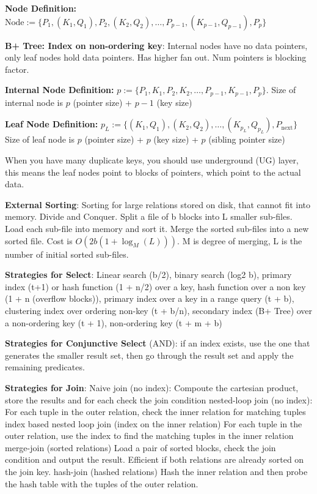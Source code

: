 \documentclass{article}
\begin{document}
\noindent \textbf{Node Definition:} $\text{Node} := \{P_1, (K_1, Q_1), P_2, (K_2, Q_2), \ldots, P_{p-1}, (K_{p-1}, Q_{p-1}), P_p\}$

\noindent \textbf{B+ Tree: Index on non-ordering key}: Internal nodes have no data pointers, only leaf nodes hold data pointers.
Has higher fan out. Num pointers is blocking factor.

\noindent \textbf{Internal Node Definition:} $p := \{P_1, K_1, P_2, K_2, \ldots, P_{p-1}, K_{p-1}, P_p\}$.
Size of internal node is $p$ (pointer size) + $p-1$ (key size)

\noindent \textbf{Leaf Node Definition:} $p_L := \{(K_1, Q_1), (K_2, Q_2), \ldots, (K_{p_L}, Q_{p_L}), P_{\text{next}}\}$
Size of leaf node is $p$ (pointer size) + $p$ (key size) + $p$ (sibling pointer size)

When you have many duplicate keys, you should use underground (UG) layer, this means the leaf nodes point to blocks of pointers,
which point to the actual data.

\noindent \textbf{External Sorting}: Sorting for large relations stored on disk, that cannot fit into memory.
Divide and Conquer. Split a file of b blocks into L smaller sub-files. Load each sub-file into memory and sort it.
Merge the sorted sub-files into a new sorted file.
Cost is $O(2b(1 + \log_M(L)))$. M is degree of merging, L is the number of initial sorted sub-files.

\noindent \textbf{Strategies for Select}: Linear search (b/2), binary search (log2 b), primary index (t+1) or hash function (1 + n/2) over a key,
hash function over a non key (1 + n (overflow blocks)), primary index over a key in a range query (t + b), clustering index over ordering non-key (t + b/n),
secondary index (B+ Tree) over a non-ordering key (t + 1), non-ordering key (t + m + b)


\noindent \textbf{Strategies for Conjunctive Select} (AND): if an index exists, use the one that generates the smaller result set,
then go through the result set and apply the remaining predicates.

\noindent \textbf{Strategies for Join}: Naive join (no index): Compoute the cartesian product, store the results and for each check the join condition
nested-loop join (no index): For each tuple in the outer relation, check the inner relation for matching tuples
index based nested loop join (index on the inner relation) For each tuple in the outer relation, use the index to find the matching tuples in the inner relation
merge-join (sorted relations) Load a pair of sorted blocks, check the join condition and output the result. Efficient if both relations
are already sorted on the join key.
hash-join (hashed relations) Hash the inner relation and then probe the hash table with the tuples of the outer relation.
\end{document}
